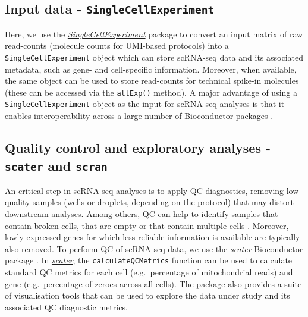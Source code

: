 \documentclass[9pt,a4paper,]{extarticle}
\begin{document}
\hypertarget{input-data---singlecellexperiment}{%
\subsection{\texorpdfstring{Input data - \texttt{SingleCellExperiment}}{Input data - SingleCellExperiment}}\label{input-data---singlecellexperiment}}

Here, we use the \emph{\href{https://bioconductor.org/packages/3.11/SingleCellExperiment}{SingleCellExperiment}} package to convert an input
matrix of raw read-counts (molecule counts for UMI-based protocols) into a
\texttt{SingleCellExperiment} object which can store scRNA-seq data and its associated metadata, such as gene- and cell-specific information.
Moreover, when available, the same object can be used to store read-counts for
technical spike-in molecules (these can be accessed via the \texttt{altExp()} method).
A major advantage of using a \texttt{SingleCellExperiment} object as the input for
scRNA-seq analyses is that it enables interoperability across a large number of
Bioconductor packages \citep{Amezquita2019}.

\hypertarget{quality-control-and-exploratory-analyses---scater-and-scran}{%
\subsection{\texorpdfstring{Quality control and exploratory analyses - \texttt{scater} and \texttt{scran}}{Quality control and exploratory analyses - scater and scran}}\label{quality-control-and-exploratory-analyses---scater-and-scran}}

An critical step in scRNA-seq analyses is to apply QC diagnostics, removing low
quality samples (wells or droplets, depending on the protocol) that may distort
downstream analyses.
Among others, QC can help to identify samples that contain broken cells, that
are empty or that contain multiple cells \citep{Ilicic2016classification}.
Moreover, lowly expressed genes for which less reliable information is
available are typically also removed.
To perform QC of scRNA-seq data, we use the \emph{\href{https://bioconductor.org/packages/3.11/scater}{scater}} Bioconductor
package \citep{McCarthy2017}.
In \emph{\href{https://bioconductor.org/packages/3.11/scater}{scater}}, the \texttt{calculateQCMetrics} function can be used to
calculate standard QC metrics for each cell (e.g.~percentage of mitochondrial
reads) and gene (e.g.~percentage of zeroes across all cells).
The package also provides a suite of visualisation tools that can be used to
explore the data under study and its associated QC diagnostic metrics.
\end{document}
